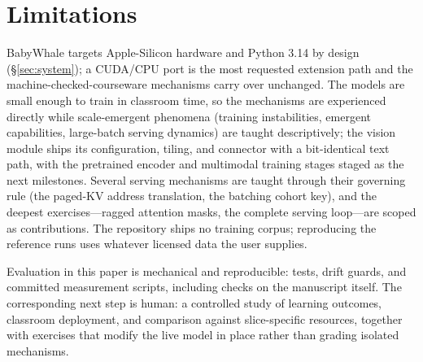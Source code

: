 \section*{Limitations}

BabyWhale targets Apple-Silicon hardware and Python 3.14 by design
(\S\ref{sec:system}); a CUDA/CPU port is the most requested extension path
and the machine-checked-courseware mechanisms carry over unchanged. The
models are small enough to train in classroom time, so the mechanisms are
experienced directly while scale-emergent phenomena (training instabilities,
emergent capabilities, large-batch serving dynamics) are taught descriptively;
the vision module ships its configuration, tiling, and connector with a
bit-identical text path, with the pretrained encoder and multimodal training
stages staged as the next milestones. Several serving mechanisms are taught
through their governing rule (the paged-KV address translation, the batching
cohort key), and the deepest exercises---ragged attention masks, the complete
serving loop---are scoped as contributions. The repository ships no training
corpus; reproducing the reference runs uses whatever licensed data the user
supplies.

Evaluation in this paper is mechanical and reproducible: tests, drift guards,
and committed measurement scripts, including checks on the manuscript itself.
The corresponding next step is human: a controlled study of learning
outcomes, classroom deployment, and comparison against slice-specific
resources, together with exercises that modify the live model in place rather
than grading isolated mechanisms.
